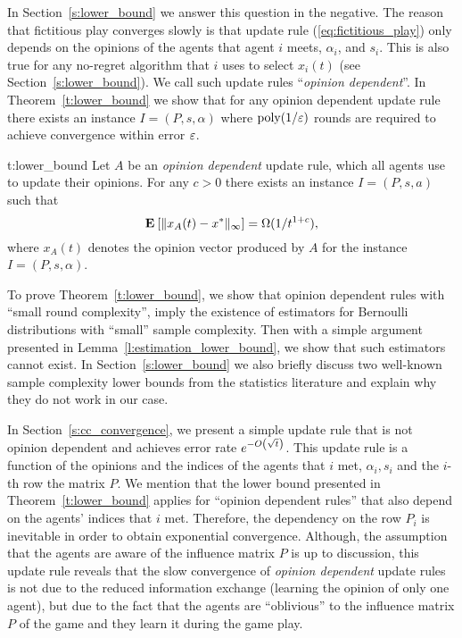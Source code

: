 In Section~\ref{s:lower_bound} we answer this question in the negative.
The reason that fictitious play converges slowly is that
update rule (\ref{eq:fictitious_play})
only depends on the opinions of the agents that agent $i$ meets,
$\alpha_i$, and $s_i$. This is also true for any no-regret algorithm
that $i$ uses to select $x_i(t)$ (see Section~\ref{s:lower_bound}).
We call such update rules \enquote{\emph{opinion dependent}}.
In Theorem~\ref{t:lower_bound} we
show that for any opinion dependent update rule there exists an instance
$I = (P,s,\alpha)$ where $\mathrm{poly}(1/\varepsilon)$ rounds are required to
achieve convergence within error $\varepsilon$.
\begin{reptheorem}{t:lower_bound}
  Let $A$ be an \emph{opinion dependent} update rule, which all
  agents use to update their opinions.
  For any $c>0$ there exists an instance $I=(P,s,a)$ such that
  \[
    \Exp{\norm{\infty}{x_A(t) - x^*}} = \Omega(1/t^{1+c}),
  \]
  where $x_A(t)$ denotes the opinion vector produced by $A$
  for the instance $I=(P,s,\alpha)$.
\end{reptheorem}
%
To prove Theorem~\ref{t:lower_bound}, we show that opinion dependent rules with
\enquote{small round complexity}, imply the existence
of estimators for Bernoulli distributions with
\enquote{small} sample complexity. Then with a simple argument
presented in Lemma~\ref{l:estimation_lower_bound},
we show that such estimators cannot exist.
In Section~\ref{s:lower_bound} we also
briefly discuss two well-known sample complexity lower bounds
from the statistics literature and explain why they do not work in our case.

In Section~\ref{s:cc_convergence}, we present a simple update rule that
is not opinion dependent and  achieves error rate $e^{-O\left(\sqrt{t}\right)}$.
This update rule is a function of the opinions and the indices of the agents
that $i$ met, $\alpha_i,s_i$ and the $i$-th row the matrix $P$.
We mention that the lower bound presented in Theorem~\ref{t:lower_bound}
applies for \enquote{opinion dependent rules} that also depend on the
agents' indices that $i$ met.  Therefore, the dependency on the row $P_i$ is
inevitable in order to obtain exponential convergence.
Although, the assumption that the agents are aware of the influence matrix
$P$ is up to discussion, this update rule reveals that the slow convergence of
\emph{opinion dependent} update rules is not due to the reduced information exchange
(learning the opinion of only one agent), but due to the fact
that the agents are \enquote{oblivious} to the influence matrix $P$ of the
game and they learn it during the game play.
